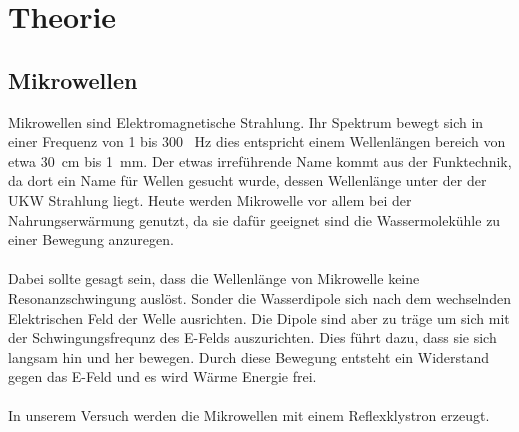 \section{Theorie}
\label{sec:Theorie}

\subsection{Mikrowellen}
Mikrowellen sind Elektromagnetische Strahlung.
Ihr Spektrum bewegt sich in einer Frequenz von 1 bis 300 \si{\Giga\Hz} dies entspricht einem Wellenlängen bereich von etwa \SI{30}{\centi\meter} bis \SI{1}{\milli\meter}.
Der etwas irreführende Name kommt aus der Funktechnik, da dort ein Name für Wellen gesucht wurde, dessen Wellenlänge unter der der UKW Strahlung liegt. 
Heute werden Mikrowelle vor allem bei der Nahrungserwärmung genutzt, da sie dafür geeignet sind die Wassermolekühle zu einer Bewegung anzuregen.
\\\\
Dabei sollte gesagt sein, dass die Wellenlänge von Mikrowelle keine Resonanzschwingung auslöst. 
Sonder die Wasserdipole sich nach dem wechselnden Elektrischen Feld der Welle ausrichten.
Die Dipole sind aber zu träge um sich mit der Schwingungsfrequnz des E-Felds auszurichten. 
Dies führt dazu, dass sie sich langsam hin und her bewegen.
Durch diese Bewegung entsteht ein Widerstand gegen das E-Feld und es wird Wärme Energie frei.
\\\\
In unserem Versuch werden die Mikrowellen mit einem Reflexklystron erzeugt.

